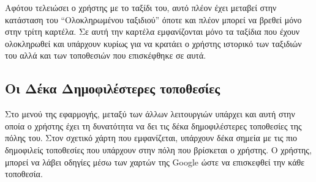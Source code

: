 \documentclass[oneside, 12pt]{book}
\begin{document}
Αφότου τελειώσει ο χρήστης με το ταξίδι του, αυτό πλέον έχει μεταβεί 
στην κατάσταση του ``Ολοκληρωμένου ταξιδιού'' όποτε και πλέον μπορεί να 
βρεθεί μόνο στην τρίτη καρτέλα.
Σε αυτή την καρτέλα εμφανίζονται μόνο τα ταξίδια που έχουν ολοκληρωθεί 
και υπάρχουν κυρίως για να κρατάει ο χρήστης ιστορικό των ταξιδιών του 
αλλά και των τοποθεσιών που επισκέφθηκε σε αυτά.

\subsection{Οι Δέκα Δημοφιλέστερες τοποθεσίες}
Στο μενού της εφαρμογής, μεταξύ των άλλων λειτουργιών υπάρχει και αυτή 
στην οποία ο χρήστης έχει τη δυνατότητα να δει τις δέκα 
δημοφιλέστερες τοποθεσίες της πόλης του. Στον σχετικό χάρτη που εμφανίζεται, υπάρχουν δέκα σημεία με τις πιο δημοφιλείς τοποθεσίες που υπάρχουν 
στην πόλη που βρίσκεται ο χρήστης. Ο χρήστης, μπορεί να λάβει οδηγίες 
μέσω των χαρτών της Google ώστε να επισκεφθεί την κάθε τοποθεσία.
\end{document}
